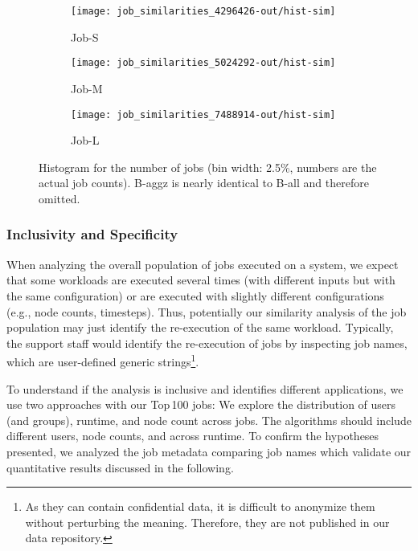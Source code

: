 \documentclass{jhps}
\begin{document}
\begin{figure}
\centering

\begin{subfigure}{0.67\textwidth}
\centering
\texttt{[image: job\_similarities\_4296426-out/hist-sim]}
\caption{Job-S}\label{fig:hist-job-S}
\end{subfigure}

\begin{subfigure}{0.67\textwidth}
\centering
\texttt{[image: job\_similarities\_5024292-out/hist-sim]}
\caption{Job-M}\label{fig:hist-job-M}
\end{subfigure}

\begin{subfigure}{0.67\textwidth}
\centering
\texttt{[image: job\_similarities\_7488914-out/hist-sim]}
\caption{Job-L}\label{fig:hist-job-L}
\end{subfigure}
\centering
\caption{Histogram for the number of jobs (bin width: 2.5\%, numbers are the actual job counts). B-aggz is nearly identical to B-all and therefore omitted.}%
\label{fig:hist}
\end{figure}

\subsubsection{Inclusivity and Specificity}

When analyzing the overall population of jobs executed on a system, we expect that some workloads are executed several times (with different inputs but with the same configuration) or are executed with slightly different configurations (e.g., node counts, timesteps).
Thus, potentially our similarity analysis of the job population may just identify the re-execution of the same workload.
Typically, the support staff would identify the re-execution of jobs by inspecting job names, which are user-defined generic strings\footnote{%
As they can contain confidential data, it is difficult to anonymize them without perturbing the meaning.
Therefore, they are not published in our data repository.
}.

To understand if the analysis is inclusive and identifies different applications, we use two approaches with our Top\,100 jobs:
We explore the distribution of users (and groups), runtime, and node count across jobs.
The algorithms should include different users, node counts, and across runtime.
To confirm the hypotheses presented, we analyzed the job metadata comparing job names which validate our quantitative results discussed in the following.
\end{document}
